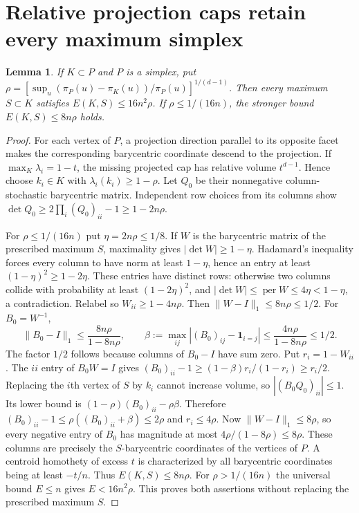 \documentclass[11pt]{article}
\newtheorem{lemma}[theorem]{Lemma}
\begin{document}
\section{Relative projection caps retain every maximum simplex}
\begin{lemma}\label{lem:caps}
If $K\subset P$ and $P$ is a simplex, put
$\rho=[\sup_u(\pi_P(u)-\pi_K(u))/\pi_P(u)]^{1/(d-1)}$.
Then every maximum $S\subset K$ satisfies $E(K,S)\le16n^2\rho$.
If $\rho\le1/(16n)$, the stronger bound $E(K,S)\le8n\rho$ holds.
\end{lemma}
\begin{proof}
For each vertex of $P$, a projection direction parallel to its opposite facet
makes the corresponding barycentric coordinate descend to the projection.
If $\max_K\lambda_i=1-t$, the missing projected cap has relative volume
$t^{d-1}$. Hence choose $k_i\in K$ with $\lambda_i(k_i)\ge1-\rho$.
Let $Q_0$ be their nonnegative column-stochastic barycentric matrix.
Independent row choices from its columns show
$\det Q_0\ge2\prod_i(Q_0)_{ii}-1\ge1-2n\rho$.

For $\rho\le1/(16n)$ put $\eta=2n\rho\le1/8$. If $W$ is the barycentric
matrix of the prescribed maximum $S$, maximality gives
$|\det W|\ge1-\eta$. Hadamard's inequality forces every column to have norm
at least $1-\eta$, hence an entry at least $(1-\eta)^2\ge1-2\eta$.
These entries have distinct rows: otherwise two columns collide with
probability at least $(1-2\eta)^2$, and
$|\det W|\le\operatorname{per}W\le4\eta<1-\eta$, a contradiction.
Relabel so $W_{ii}\ge1-4n\rho$. Then
$\|W-I\|_1\le8n\rho\le1/2$. For $B_0=W^{-1}$,
\[
\|B_0-I\|_1\le\frac{8n\rho}{1-8n\rho},\qquad
\beta:=\max_{ij}|(B_0)_{ij}-\mathbf1_{i=j}|
\le\frac{4n\rho}{1-8n\rho}\le1/2.
\]
The factor $1/2$ follows because columns of $B_0-I$ have sum zero.
Put $r_i=1-W_{ii}$. The $ii$ entry of $B_0W=I$ gives
$(B_0)_{ii}-1\ge(1-\beta)r_i/(1-r_i)\ge r_i/2$.
Replacing the $i$th vertex of $S$ by $k_i$ cannot increase volume, so
$|(B_0Q_0)_{ii}|\le1$. Its lower bound is
$(1-\rho)(B_0)_{ii}-\rho\beta$. Therefore
$(B_0)_{ii}-1\le\rho((B_0)_{ii}+\beta)\le2\rho$ and $r_i\le4\rho$.
Now $\|W-I\|_1\le8\rho$, so every negative entry of $B_0$ has magnitude
at most $4\rho/(1-8\rho)\le8\rho$. These columns are precisely the
$S$-barycentric coordinates of the vertices of $P$. A centroid homothety of
excess $t$ is characterized by all barycentric coordinates being at least
$-t/n$. Thus $E(K,S)\le8n\rho$.
For $\rho>1/(16n)$ the universal bound $E\le n$ gives $E<16n^2\rho$.
This proves both assertions without replacing the prescribed maximum $S$.
\end{proof}
\end{document}
